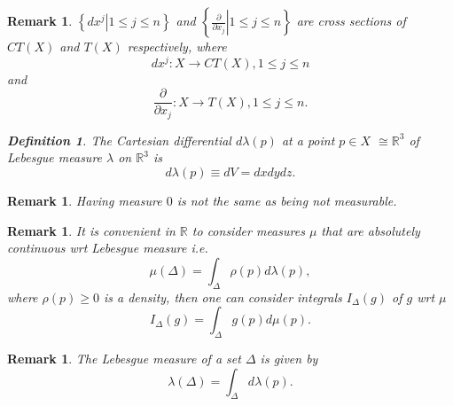 \documentclass[aps,preprint]{revtex4}%
\newtheorem{definition}[theorem]{Definition}
\newtheorem{remark}[theorem]{Remark}
\begin{document}
\begin{remark}
$\left\{  \left.  dx^{j}\right\vert 1\leq j\leq n\right\}  $ and $\left\{
\left.  \frac{\partial}{\partial x_{j}}\right\vert 1\leq j\leq n\right\}  $
are \emph{cross sections} of $CT\left(  X\right)  $ and $T\left(  X\right)  $
respectively, where
\begin{equation}
dx^{j}:X\rightarrow CT\left(  X\right)  ,1\leq j\leq n
\end{equation}
and
\begin{equation}
\frac{\partial}{\partial x_{j}}:X\rightarrow T\left(  X\right)  ,1\leq j\leq
n.
\end{equation}


\begin{definition}
The \emph{Cartesian} \emph{differential} $d\lambda\left(  p\right)  $ at a
point $p\in X$ $\cong\mathbb{R}^{3}$ of Lebesgue measure $\lambda$ on
$\mathbb{R}^{3}$ is
\begin{equation}
d\lambda\left(  p\right)  \equiv dV=dxdydz.
\end{equation}

\end{definition}
\end{remark}

\begin{remark}
Having measure $0$ is \emph{not the same} as being not measurable.
\end{remark}

\begin{remark}
It is convenient in $\mathbb{R}$ to consider measures $\mu$ that are
absolutely continuous wrt Lebesgue measure i.e.%
\begin{equation}
\mu\left(  \Delta\right)  =\int_{\Delta}\rho\left(  p\right)  d\lambda\left(
p\right)  ,
\end{equation}
where $\rho\left(  p\right)  \geq0$ is a density, then one can consider
integrals $I_{\Delta}\left(  g\right)  $ of $g$ wrt $\mu$
\begin{equation}
I_{\Delta}\left(  g\right)  =\int_{\Delta}g\left(  p\right)  d\mu\left(
p\right)  .
\end{equation}

\end{remark}

\begin{remark}
The Lebesgue measure of a set $\Delta$ is given by
\begin{equation}
\lambda\left(  \Delta\right)  =\int_{\Delta}d\lambda\left(  p\right)  .
\end{equation}

\end{remark}
\end{document}
